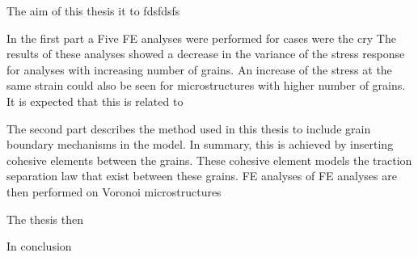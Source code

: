 \documentclass[abstract.tex]{subfiles}
\begin{document}
The aim of this thesis it to fdsfdsfs

In the first part  a
Five FE analyses were performed for cases were the cry
The results of these analyses showed a decrease in the variance of the stress response 
for analyses with increasing number of grains. An increase of the stress at the same strain could also
be seen for microstructures with higher number of grains. It is expected that this is related to 

The second part describes the method used in this thesis to include grain boundary mechanisms in the model.
In summary, this is achieved by inserting cohesive elements between the grains. These cohesive element models the
traction separation law that exist between these grains. FE analyses of 
FE analyses are then performed on Voronoi microstructures 

The thesis then 

In conclusion
\end{document}

